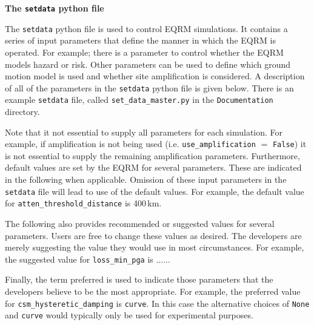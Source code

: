 \documentclass[a4paper, 12pt]{report}
\begin{document}
\newcommand{\indexfunc}[1]{\index{#1@\texttt{#1}}\index{function!#1@\texttt{#1}}}
\newcommand{\typepar}[3]{\linebreak[2]\texttt{#1}\-\texttt{#2}\-\texttt{#3}}
\newcommand{\typeself}[3]{\linebreak[2]\texttt{#1}\-\texttt{#2}\-\texttt{#3}\index{#1#2#3@\texttt{#1#2#3}}}
\newcommand{\indexpar}[1]{\index{#1@\texttt{#1}}\index{setdata parameter@ \texttt{setdata} parameter!#1@\texttt{#1}}}
\newcommand{\typefunc}[3]{\linebreak[2]\texttt{#1}\-\texttt{#2}\-\texttt{#3}\indexfunc{#1#2#3}}

\newcommand{\manual}[1]{Manual: #1}

\LARGE \noindent \textbf{The \texttt{setdata} python file}

\vspace{1em}
\normalsize The \texttt{setdata} python file is used to
control EQRM simulations. It contains a series of input parameters
that define the manner in which the EQRM is operated. For example;
there is a parameter to control whether the EQRM models hazard or
risk. Other parameters can be used to define which ground motion
model is used and whether site amplification is considered. A
description of all of the parameters in the
 \texttt{setdata} python file is given below.
 There is an example
\texttt{setdata} file, called \texttt{set\_data\_master.py}
in the \texttt{Documentation} directory. 

\vspace{1em}
Note that it not essential to supply all parameters for each simulation. 
For example, if amplification is not being used (i.e. \texttt{use\_amplification} $=$ \texttt{False}) 
it is not essential to supply the remaining amplification parameters. 
Furthermore, default values are set by the
EQRM for several parameters. These are indicated in the following when
applicable. Omission of these input parameters in the 
\texttt{setdata} file will lead to use of the default values. For example, 
the default value for \texttt{atten\_threshold\_distance} is 400\,km.

\vspace{1em}
The following also provides recommended or suggested values for several parameters. 
Users are free to change these values as desired. The developers are merely suggesting 
the value they would use in most circumstances. For example, the suggested value for 
\texttt{loss\_min\_pga} is ...... 

\vspace{1em}
Finally, the term preferred is used to indicate those parameters that the developers believe to 
be the most appropriate. For example, the preferred value for \typepar{csm\_}{hysteretic\_}{damping}
is \texttt{curve}. In this case the alternative choices of \texttt{None} and \texttt{curve} 
would typically only be used for experimental purposes. 
\end{document}
